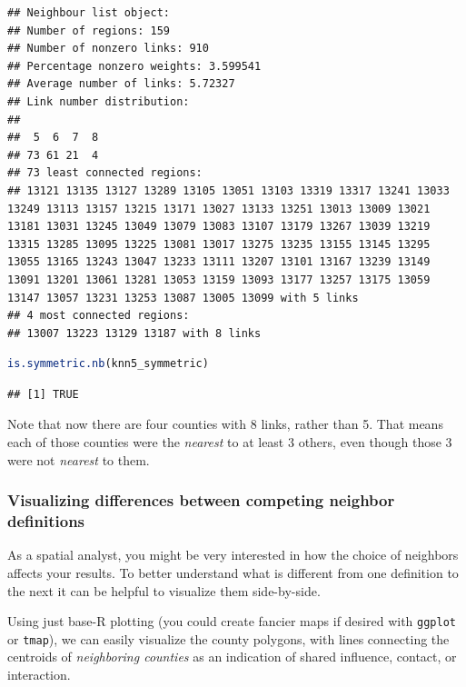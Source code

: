 \documentclass[
]{book}
\newcommand{\passthrough}[1]{#1}
\begin{document}
\begin{lstlisting}
## Neighbour list object:
## Number of regions: 159 
## Number of nonzero links: 910 
## Percentage nonzero weights: 3.599541 
## Average number of links: 5.72327 
## Link number distribution:
## 
##  5  6  7  8 
## 73 61 21  4 
## 73 least connected regions:
## 13121 13135 13127 13289 13105 13051 13103 13319 13317 13241 13033 13249 13113 13157 13215 13171 13027 13133 13251 13013 13009 13021 13181 13031 13245 13049 13079 13083 13107 13179 13267 13039 13219 13315 13285 13095 13225 13081 13017 13275 13235 13155 13145 13295 13055 13165 13243 13047 13233 13111 13207 13101 13167 13239 13149 13091 13201 13061 13281 13053 13159 13093 13177 13257 13175 13059 13147 13057 13231 13253 13087 13005 13099 with 5 links
## 4 most connected regions:
## 13007 13223 13129 13187 with 8 links
\end{lstlisting}

\begin{lstlisting}[language=R]
is.symmetric.nb(knn5_symmetric)
\end{lstlisting}

\begin{lstlisting}
## [1] TRUE
\end{lstlisting}

Note that now there are four counties with 8 links, rather than 5. That means each of those counties were the \emph{nearest} to at least 3 others, even though those 3 were not \emph{nearest} to them.

\hypertarget{visualizing-differences-between-competing-neighbor-definitions}{%
\subsubsection{Visualizing differences between competing neighbor definitions}\label{visualizing-differences-between-competing-neighbor-definitions}}

As a spatial analyst, you might be very interested in how the choice of neighbors affects your results. To better understand what is different from one definition to the next it can be helpful to visualize them side-by-side.

Using just base-R plotting (you could create fancier maps if desired with \passthrough{\lstinline!ggplot!} or \passthrough{\lstinline!tmap!}), we can easily visualize the county polygons, with lines connecting the centroids of \emph{neighboring counties} as an indication of shared influence, contact, or interaction.
\end{document}
